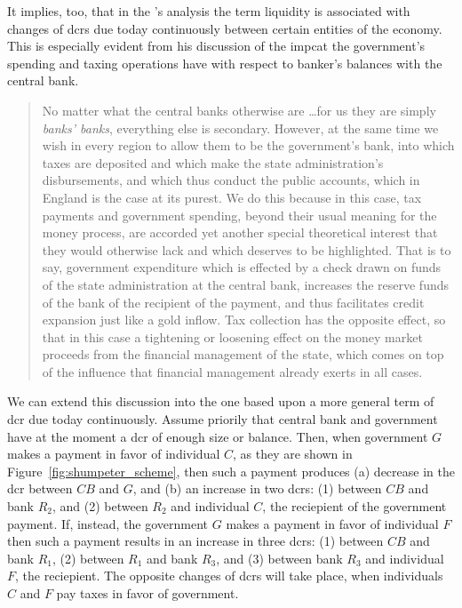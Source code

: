 It implies, too, that in the \citeauthor{schumpeter2014}'s analysis the term liquidity is associated with changes of \acfp{dcr} due today continuously between certain entities of the economy. This is especially evident from his discussion of the impcat the government's spending and taxing operations have with respect to banker's balances with the central bank. 

\begin{quote}
No matter what the central banks otherwise are \dots for us
they are simply \textit{banks' banks}, everything else is secondary. However, at the same time we wish in every region to allow them to be the government's bank, into which taxes are deposited and which make the state administration's
disbursements, and which thus conduct the public accounts, which in England is
the case at its purest. We do this because in this case, tax payments and
government spending, beyond their usual meaning for the money process, are
accorded yet another special theoretical interest that they would otherwise lack
and which deserves to be highlighted. That is to say, government expenditure
which is effected by a check drawn on funds of the state administration at the
central bank, increases the reserve funds of the bank of the recipient of the
payment, and thus facilitates credit expansion just like a gold inflow.
Tax collection has the opposite effect, so that in this case a tightening or loosening
effect on the money market proceeds from the financial management of the
state, which comes on top of the influence that financial management already
exerts in all cases.~\citep[pp.~166-167, emphasis original]{schumpeter2014} 
\end{quote}

We can extend this discussion into the one based upon a more general term of \acf{dcr} due today continuously. Assume priorily that central bank and government have at the moment a \acf{dcr} of enough size or balance. Then, when government $G$ makes a payment in favor of individual $C$, as they are shown in Figure~\ref{fig:shumpeter_scheme}, then such a payment produces (a) decrease in the \ac{dcr} between $CB$ and $G$, and (b) an increase in two \acp{dcr}: (1) between $CB$ and bank $R_2$, and (2) between $R_2$ and individual $C$, the reciepient of the government payment. If, instead, the government $G$ makes a payment in favor of individual $F$ then such a payment results in an increase in three \acp{dcr}: (1) between $CB$ and bank $R_1$, (2) between $R_1$ and bank $R_3$, and (3) between bank $R_3$ and individual $F$, the reciepient. The opposite changes of \acp{dcr} will take place, when individuals $C$ and $F$ pay taxes in favor of government. 

